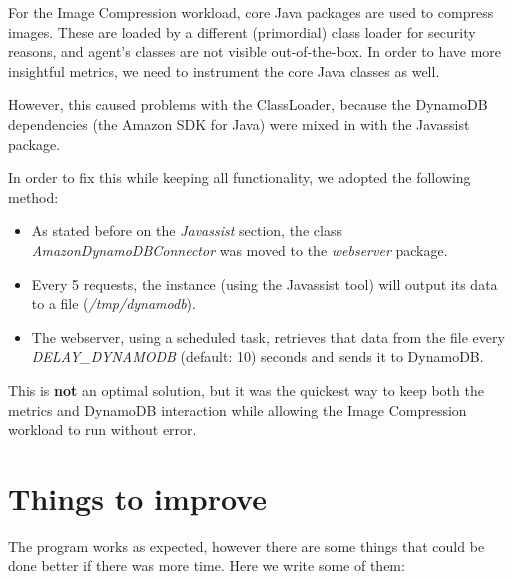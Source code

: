 \documentclass{article}
\begin{document}
For the Image Compression workload, core Java packages are used to compress
images. These are loaded by a different (primordial) class loader for security
reasons, and agent's classes are not visible out-of-the-box. In order to have
more insightful metrics, we need to instrument the core Java classes as well.

However, this caused problems with the ClassLoader, because the DynamoDB
dependencies (the Amazon SDK for Java) were mixed in with the Javassist package.

In order to fix this while keeping all functionality, we adopted the following
method:

\begin{itemize}
    \item As stated before on the \textit{Javassist} section, the class
        \textit{AmazonDynamoDBConnector} was moved to the \textit{webserver}
        package.
    \item Every 5 requests, the instance (using the Javassist tool) will output
        its data to a file (\textit{/tmp/dynamodb}).
    \item The webserver, using a scheduled task, retrieves that data from the
        file every \textit{DELAY\_DYNAMODB} (default: 10) seconds and sends it
        to DynamoDB.
\end{itemize}

This is \textbf{not} an optimal solution, but it was the quickest way to keep
both the metrics and DynamoDB interaction while allowing the Image Compression
workload to run without error.

\section{Things to improve}

The program works as expected, however there are some things that could be done
better if there was more time. Here we write some of them:
\end{document}
